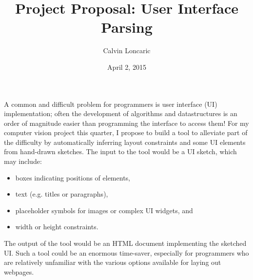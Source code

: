 \documentclass{article}
\title{Project Proposal: User Interface Parsing}
\author{Calvin Loncaric}
\date{April 2, 2015}
\begin{document}
\maketitle

A common and difficult problem for programmers is user interface (UI)
implementation; often the development of algorithms and datastructures is an
order of magnitude easier than programming the interface to access them! For my
computer vision project this quarter, I propose to build a tool to alleviate
part of the difficulty by automatically inferring layout constraints and some UI
elements from hand-drawn sketches. The input to the tool would be a UI sketch,
which may include:
\begin{itemize}
\item boxes indicating positions of elements,
\item text (e.g. titles or paragraphs),
\item placeholder symbols for images or complex UI widgets, and
\item width or height constraints.
\end{itemize}
The output of the tool would be an HTML document implementing the sketched UI.
Such a tool could be an enormous time-saver, especially for programmers who are
relatively unfamiliar with the various options available for laying out
webpages.
\end{document}
